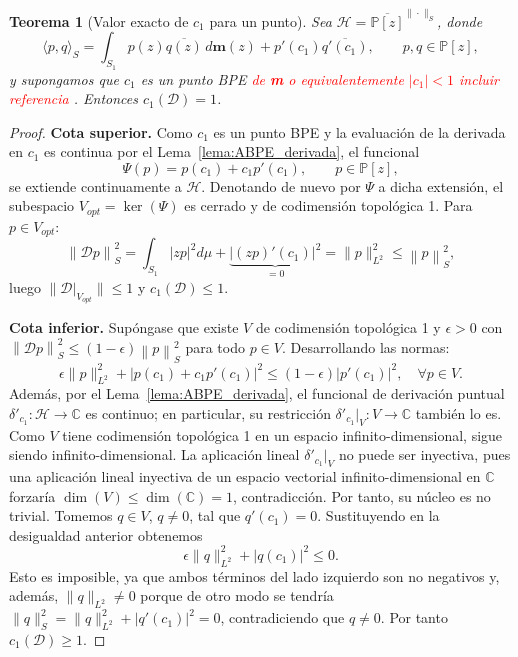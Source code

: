 \documentclass[12pt,a4paper]{article}
\newtheorem{theorem}{Teorema}
\theoremstyle{definition}
\theoremstyle{remark}
\newcommand{\Poly}{\mathbb{P}[z]}
\newcommand{\norm}[1]{\left\| #1 \right\|_S}
\newcommand{\abs}[1]{\left| #1 \right|}
\begin{document}
\begin{theorem}[Valor exacto de $c_1$ para un punto]
	\label{thm:c2_punto}
	Sea $\mathcal{H} = \overline{\Poly}^{\|\cdot\|_S}$, donde
	\begin{equation}
		\langle p, q \rangle_S = \int_{S_1} p(z)\overline{q(z)} \, d\mathbf{m}(z) + p'(c_1)\overline{q'(c_1)}, \qquad p,q \in \Poly,
	\end{equation}
	y supongamos que $c_1$ es un punto BPE \textcolor{red}{de {\bf m} o equivalentemente $\vert c_1\vert <1$ incluir referencia }. Entonces $c_1(\mathcal{D}) = 1$.
\end{theorem}

\begin{proof}
	\textbf{Cota superior.} Como $c_1$ es un punto BPE y la evaluación de la derivada en $c_1$ es continua por el Lema~\ref{lema:ABPE_derivada}, el funcional
	\[
		\Psi(p) = p(c_1) + c_1 p'(c_1), \qquad p \in \Poly,
	\]
	se extiende continuamente a $\mathcal{H}$. Denotando de nuevo por $\Psi$ a dicha extensión, el subespacio $V_{opt} = \ker(\Psi)$ es cerrado y de codimensión topológica 1. Para $p \in V_{opt}$:
	\[
		\norm{\mathcal{D}p}^2 = \int_{S_1} \abs{zp}^2 d\mu + \underbrace{\abs{(zp)'(c_1)}^2}_{=0} = \|p\|_{L^2}^2 \le \norm{p}^2,
	\]
	luego $\|\mathcal{D}|_{V_{opt}}\| \le 1$ y $c_1(\mathcal{D}) \le 1$.

	\textbf{Cota inferior.} Supóngase que existe $V$ de codimensión topológica 1 y $\epsilon > 0$ con $\norm{\mathcal{D}p}^2 \le (1-\epsilon)\norm{p}^2$ para todo $p \in V$. Desarrollando las normas:
	\[
		\epsilon \|p\|_{L^2}^2 + \abs{p(c_1) + c_1 p'(c_1)}^2 \le (1-\epsilon)\abs{p'(c_1)}^2, \quad \forall p \in V.
	\]
	Además, por el Lema~\ref{lema:ABPE_derivada}, el funcional de derivación puntual $\delta'_{c_1}: \mathcal{H} \to \mathbb{C}$ es continuo; en particular, su restricción $\delta'_{c_1}|_V : V \to \mathbb{C}$ también lo es. Como $V$ tiene codimensión topológica 1 en un espacio infinito-dimensional, sigue siendo infinito-dimensional. La aplicación lineal $\delta'_{c_1}|_V$ no puede ser inyectiva, pues una aplicación lineal inyectiva de un espacio vectorial infinito-dimensional en $\mathbb{C}$ forzaría $\dim(V) \leq \dim(\mathbb{C}) = 1$, contradicción. Por tanto, su núcleo es no trivial. Tomemos $q \in V$, $q \neq 0$, tal que $q'(c_1)=0$. Sustituyendo en la desigualdad anterior obtenemos
	\[
		\epsilon \|q\|_{L^2}^2 + \abs{q(c_1)}^2 \le 0.
	\]
	Esto es imposible, ya que ambos términos del lado izquierdo son no negativos y, además, $\|q\|_{L^2} \neq 0$ porque de otro modo se tendría $\|q\|_S^2 = \|q\|_{L^2}^2 + \abs{q'(c_1)}^2 = 0$, contradiciendo que $q \neq 0$. Por tanto $c_1(\mathcal{D}) \ge 1$.
\end{proof}
\end{document}
